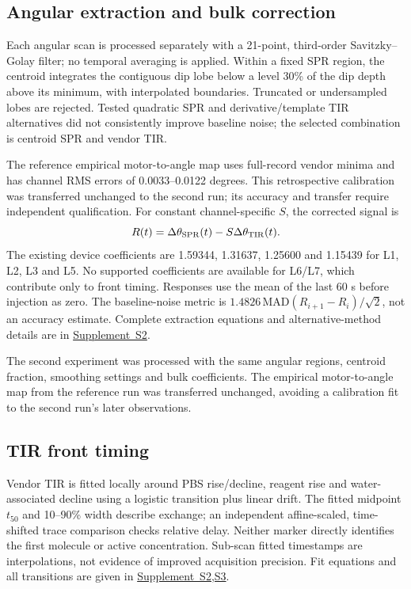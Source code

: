 \documentclass[lettersize,journal]{IEEEtran}
\newcommand{\supp}[1]{\href{SPR_smart_stop_supplement.pdf}{Supplement~#1}}
\begin{document}
\subsection{Angular extraction and bulk correction}
Each angular scan is processed separately with a 21-point, third-order
Savitzky--Golay filter; no temporal averaging is applied. Within a fixed
SPR region, the centroid integrates the contiguous dip lobe below a level
30\% of the dip depth above its minimum, with interpolated boundaries.
Truncated or undersampled lobes are rejected. Tested quadratic SPR and
derivative/template TIR alternatives did not consistently improve baseline
noise; the selected combination is centroid SPR and vendor TIR.

The reference empirical motor-to-angle map uses full-record vendor minima
and has channel RMS errors of 0.0033--0.0122 degrees. This retrospective
calibration was transferred unchanged to the second run; its accuracy and
transfer require independent qualification. For constant channel-specific
$S$, the corrected signal is
\begin{equation}
 R(t)=\Delta\theta_{\rm SPR}(t)-S\Delta\theta_{\rm TIR}(t).
\end{equation}
The existing device coefficients are 1.59344, 1.31637, 1.25600 and 1.15439
for L1, L2, L3 and L5. No supported coefficients are available for L6/L7,
which contribute only to front timing. Responses use the mean of the last
60 s before injection as zero. The baseline-noise metric is
$1.4826\,\mathrm{MAD}(R_{i+1}-R_i)/\sqrt2$, not an accuracy estimate.
Complete extraction equations and alternative-method details are in
\supp{S2}.

The second experiment was processed with the same angular regions,
centroid fraction, smoothing settings and bulk coefficients. The empirical
motor-to-angle map from the reference run was transferred unchanged,
avoiding a calibration fit to the second run's later observations.

\subsection{TIR front timing}
Vendor TIR is fitted locally around PBS rise/decline, reagent rise and
water-associated decline using a logistic transition plus linear drift.
The fitted midpoint $t_{50}$ and 10--90\% width describe exchange; an
independent affine-scaled, time-shifted trace comparison checks relative
delay. Neither marker directly identifies the first molecule or active
concentration. Sub-scan fitted timestamps are interpolations, not evidence
of improved acquisition precision. Fit equations and all transitions are
given in \supp{S2,S3}.
\end{document}
